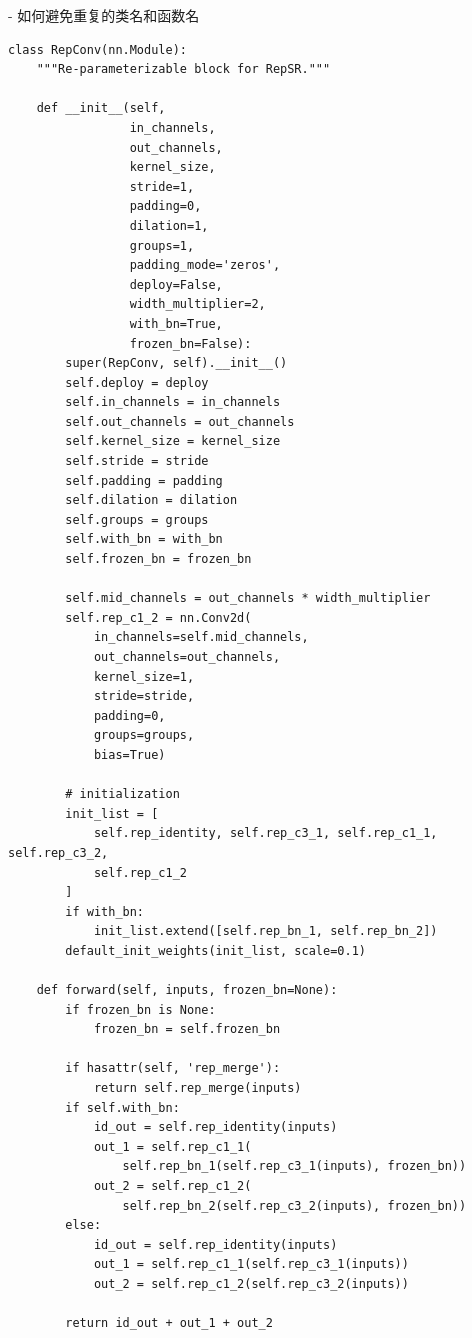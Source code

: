\documentclass[../main.tex]{subfiles}
\begin{document}
- 如何避免重复的类名和函数名

\begin{verbatim}
class RepConv(nn.Module):
    """Re-parameterizable block for RepSR."""

    def __init__(self,
                 in_channels,
                 out_channels,
                 kernel_size,
                 stride=1,
                 padding=0,
                 dilation=1,
                 groups=1,
                 padding_mode='zeros',
                 deploy=False,
                 width_multiplier=2,
                 with_bn=True,
                 frozen_bn=False):
        super(RepConv, self).__init__()
        self.deploy = deploy
        self.in_channels = in_channels
        self.out_channels = out_channels
        self.kernel_size = kernel_size
        self.stride = stride
        self.padding = padding
        self.dilation = dilation
        self.groups = groups
        self.with_bn = with_bn
        self.frozen_bn = frozen_bn

        self.mid_channels = out_channels * width_multiplier
        self.rep_c1_2 = nn.Conv2d(
            in_channels=self.mid_channels,
            out_channels=out_channels,
            kernel_size=1,
            stride=stride,
            padding=0,
            groups=groups,
            bias=True)

        # initialization
        init_list = [
            self.rep_identity, self.rep_c3_1, self.rep_c1_1, self.rep_c3_2,
            self.rep_c1_2
        ]
        if with_bn:
            init_list.extend([self.rep_bn_1, self.rep_bn_2])
        default_init_weights(init_list, scale=0.1)

    def forward(self, inputs, frozen_bn=None):
        if frozen_bn is None:
            frozen_bn = self.frozen_bn

        if hasattr(self, 'rep_merge'):
            return self.rep_merge(inputs)
        if self.with_bn:
            id_out = self.rep_identity(inputs)
            out_1 = self.rep_c1_1(
                self.rep_bn_1(self.rep_c3_1(inputs), frozen_bn))
            out_2 = self.rep_c1_2(
                self.rep_bn_2(self.rep_c3_2(inputs), frozen_bn))
        else:
            id_out = self.rep_identity(inputs)
            out_1 = self.rep_c1_1(self.rep_c3_1(inputs))
            out_2 = self.rep_c1_2(self.rep_c3_2(inputs))

        return id_out + out_1 + out_2
\end{verbatim}
\end{document}
